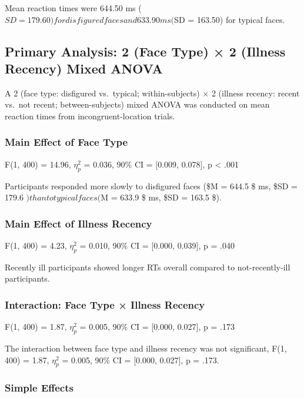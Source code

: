 \documentclass[
  english,
  man]{apa6}
\begin{document}
Mean reaction times were 644.50 ms
(\(SD = 179.60) for disfigured faces and
633.90 ms
(\)SD = 163.50) for typical faces.

\subsection{Primary Analysis: 2 (Face Type) × 2 (Illness Recency) Mixed ANOVA}\label{primary-analysis-2-face-type-2-illness-recency-mixed-anova}

A 2 (face type: disfigured vs.~typical; within-subjects) × 2 (illness recency: recent vs.~not recent; between-subjects) mixed ANOVA was conducted on mean reaction times from incongruent-location trials.

\subsubsection{Main Effect of Face Type}\label{main-effect-of-face-type}

F(1, 400) = 14.96, \(\eta_{p}^{2}\) = 0.036, 90\% CI = {[}0.009, 0.078{]}, p \textless{} .001

Participants responded more slowly to disfigured faces (\$M = 644.5 \$ ms, \$SD = 179.6 \() than to typical faces (\)M = 633.9 \$ ms, \$SD = 163.5 \$).

\subsubsection{Main Effect of Illness Recency}\label{main-effect-of-illness-recency}

F(1, 400) = 4.23, \(\eta_{p}^{2}\) = 0.010, 90\% CI = {[}0.000, 0.039{]}, p = .040

Recently ill participants showed longer RTs overall compared to not-recently-ill participants.

\subsubsection{Interaction: Face Type × Illness Recency}\label{interaction-face-type-illness-recency}

F(1, 400) = 1.87, \(\eta_{p}^{2}\) = 0.005, 90\% CI = {[}0.000, 0.027{]}, p = .173

The interaction between face type and illness recency was not significant, F(1, 400) = 1.87, \(\eta_{p}^{2}\) = 0.005, 90\% CI = {[}0.000, 0.027{]}, p = .173.

\subsubsection{Simple Effects}\label{simple-effects}
\end{document}
